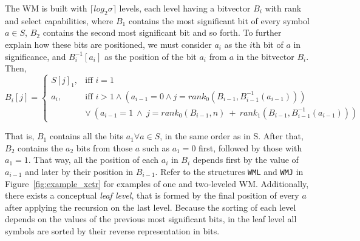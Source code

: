 \documentclass[runningheads]{llncs}
\begin{document}
The WM is built with $\lceil log_2\sigma\rceil$ levels, each level having a bitvector $B_i$ with rank and select capabilities, where $B_1$ contains the most significant bit of every symbol $a \in S$, $B_2$ contains the second most significant bit and so forth. To further explain how these bits are positioned, we must consider $a_i$ as the $i$th bit of $a$ in significance, and $B^{-1}_i[a_i]$ as the position of the bit $a_i$ from $a$ in the bitvector $B_i$. Then, 
\[
    B_i[j] = \left\{\begin{array}{lr}
        S[j]_1, & \text{iff } i=1\\
        a_i, & \text{iff } i>1 \wedge (a_{i-1}=0 \wedge j=rank_0(B_{i-1},B^{-1}_{i-1}(a_{i-1}))) \\
        & \vee~(a_{i-1}=1~\wedge~j=rank_0(B_{i-1},n)~+~rank_1(B_{i-1},B^{-1}_{i-1}(a_{i-1})))
        \end{array}\right.
\]

That is, $B_1$ contains all the bits $a_1 \forall a \in S$, in the same order as in S. After that, $B_2$ contains the $a_2$ bits from those $a$ such as $a_1 = 0$ first, followed by those with $a_1 = 1$. That way, all the position of each $a_i$ in $B_i$ depends first by the value of $a_{i-1}$ and later by their position in $B_{i-1}$. Refer to the structures \texttt{WML} and \texttt{WMJ} in Figure~\ref{fig:example_xctr} for examples of one and two-leveled WM. Additionally, there exists a conceptual \textit{leaf level}, that is formed by the final position of every $a$ after applying the recursion on the last level. Because the sorting of each level depends on the values of the previous most significant bits, in the leaf level all symbols are sorted by their reverse representation in bits.
\end{document}
